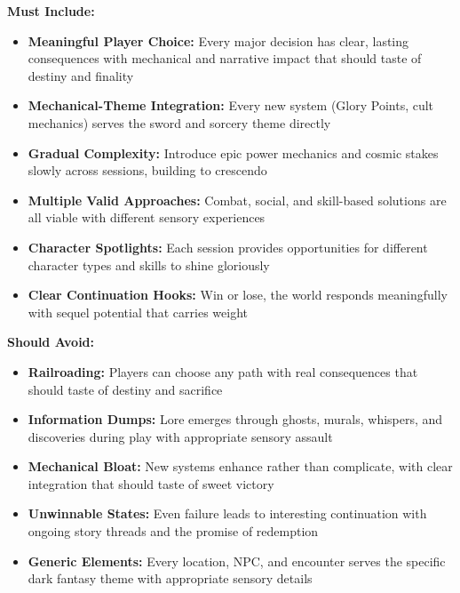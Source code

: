 \documentclass[11pt]{article}
\newcommand{\cmark}{\ding{51}}%
\begin{document}
\begin{itemize}
\textbf{Must Include:}
\begin{itemize}
\item \cmark \textbf{Meaningful Player Choice:} Every major decision has clear, lasting consequences with mechanical and narrative impact that should taste of destiny and finality
\item \cmark \textbf{Mechanical-Theme Integration:} Every new system (Glory Points, cult mechanics) serves the sword and sorcery theme directly
\item \cmark \textbf{Gradual Complexity:} Introduce epic power mechanics and cosmic stakes slowly across sessions, building to crescendo
\item \cmark \textbf{Multiple Valid Approaches:} Combat, social, and skill-based solutions are all viable with different sensory experiences
\item \cmark \textbf{Character Spotlights:} Each session provides opportunities for different character types and skills to shine gloriously
\item \cmark \textbf{Clear Continuation Hooks:} Win or lose, the world responds meaningfully with sequel potential that carries weight
\end{itemize}

\textbf{Should Avoid:}
\begin{itemize}
\item \cmark \textbf{Railroading:} Players can choose any path with real consequences that should taste of destiny and sacrifice
\item \cmark \textbf{Information Dumps:} Lore emerges through ghosts, murals, whispers, and discoveries during play with appropriate sensory assault
\item \cmark \textbf{Mechanical Bloat:} New systems enhance rather than complicate, with clear integration that should taste of sweet victory
\item \cmark \textbf{Unwinnable States:} Even failure leads to interesting continuation with ongoing story threads and the promise of redemption
\item \cmark \textbf{Generic Elements:} Every location, NPC, and encounter serves the specific dark fantasy theme with appropriate sensory details
\end{itemize}


\end{itemize}
\end{document}
